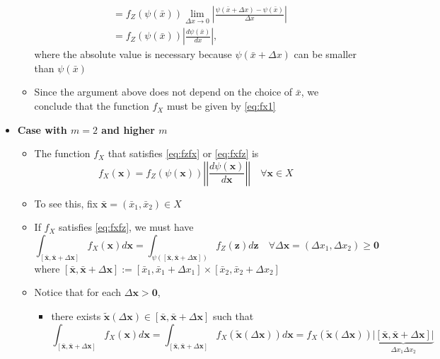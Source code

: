 \documentclass[12pt,a4paper]{article}
\begin{document}
\begin{itemize}
\begin{itemize}
\begin{align}
        & = f_{Z}(\psi(\bar{x}))\lim_{\Delta x \to 0} \left|\frac{\psi(\bar{x}+\Delta x) - \psi(\bar{x})}{\Delta x}\right| \nonumber \\
        & = f_{Z}(\psi(\bar{x}))\left| \frac{d\psi(\bar{x})}{dx}\right|,
    \nonumber%
    \end{align}
    where the absolute value is necessary because $\psi(\bar{x}+\Delta x)$ can be smaller than $\psi(\bar{x})$
  \item Since the argument above does not depend on the choice of $\bar{x}$,
    we conclude that the function $f_{X}$ must be given by \eqref{eq:fx1}
  \end{itemize}

\item \textbf{Case with $m=2$ and higher $m$}
  \begin{itemize}
  \item The function $f_{X}$ that satisfies \eqref{eq:fzfx} or \eqref{eq:fxfz} is
    \begin{equation}\label{eq:fx2}%
      f_{X}(\bm{x}) =
      f_{Z}(\psi(\bm{x}))\left|\left| \frac{d\psi(\bm{x})}{d\bm{x}}\right|\right|
      \quad \forall \bm{x} \in X
    \end{equation}
  \item To see this, fix $\bar{\bm{x}} = (\bar{x}_{1},\bar{x}_{2})\in X$
  \item If $f_{X}$ satisfies \eqref{eq:fxfz}, we must have
    \begin{equation}\label{eq:fxfz2}%
      \int_{[\bar{\bm{x}}, \bar{\bm{x}}+\Delta \bm{x}]} f_{X}(\bm{x})d\bm{x}
      = 
      \int_{\psi([\bar{\bm{x}}, \bar{\bm{x}}+\Delta \bm{x}])} f_{Z}(\bm{z})d\bm{z}
      \quad \forall \Delta \bm{x} = (\Delta x_{1}, \Delta x_{2})\geq \bm{0}
    \end{equation}
    where $[\bar{\bm{x}}, \bar{\bm{x}}+\Delta \bm{x}] := [\bar{x}_{1},\bar{x}_{1}+\Delta x_{1}]\times[\bar{x}_{2},\bar{x}_{2}+\Delta x_{2}]$
  \item Notice that for each $\Delta \bm{x}>\bm{0}$,
    \begin{itemize}
    \item there exists $\tilde{\bm{x}}(\Delta \bm{x}) \in [\bar{\bm{x}},\bar{\bm{x}}+\Delta \bm{x}]$ such that
      \begin{equation}\label{eq:fxdx2}%
        \int_{[\bar{\bm{x}}, \bar{\bm{x}}+\Delta \bm{x}]} f_{X}(\bm{x})d\bm{x}
        =
        \int_{[\bar{\bm{x}}, \bar{\bm{x}}+\Delta \bm{x}]} f_{X}(\tilde{\bm{x}}(\Delta\bm{x}))d\bm{x}
        =
        f_{X}(\tilde{\bm{x}}(\Delta \bm{x}))\underbrace{|[\bar{\bm{x}},\bar{\bm{x}}+\Delta \bm{x}]|}_{\Delta x_{1}\Delta x_{2}}

\end{equation}
\end{itemize}
\end{itemize}
\end{itemize}
\end{document}
